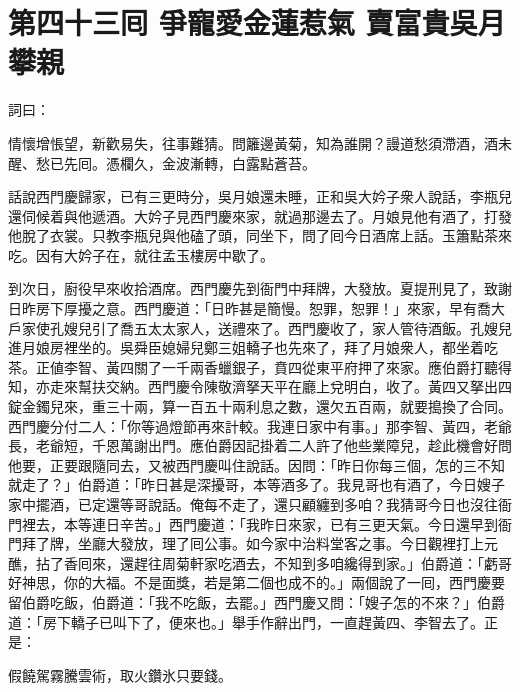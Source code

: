 
\chapter*{第四十三囘 爭寵愛金蓮惹氣 賣富貴吳月攀親}


詞曰：

\begin{myquote}
情懷增悵望，新歡易失，往事難猜。問籬邊黃菊，知為誰開？謾道愁須滯酒，酒未醒、愁已先囘。憑欄久，金波漸轉，白露點蒼苔。

\end{myquote}

話說西門慶歸家，已有三更時分，吳月娘還未睡，正和吳大妗子衆人說話，李瓶兒還伺候着與他遞酒。大妗子見西門慶來家，就過那邊去了。月娘見他有酒了，打發他脫了衣裳。只教李瓶兒與他磕了頭，同坐下，問了囘今日酒席上話。玉簫點茶來吃。因有大妗子在，就往孟玉樓房中歇了。

到次日，廚役早來收拾酒席。西門慶先到衙門中拜牌，大發放。夏提刑見了，致謝日昨房下厚擾之意。西門慶道：「日昨甚是簡慢。恕罪，恕罪！」來家，早有喬大戶家使孔嫂兒引了喬五太太家人，送禮來了。西門慶收了，家人管待酒飯。孔嫂兒進月娘房裡坐的。吳舜臣媳婦兒鄭三姐轎子也先來了，拜了月娘衆人，都坐着吃茶。正値李智、黃四關了一千兩香蠟銀子，賁四從東平府押了來家。應伯爵打聽得知，亦走來幫扶交納。西門慶令陳敬濟拏天平在廳上兌明白，收了。黃四又拏出四錠金鐲兒來，重三十兩，算一百五十兩利息之數，還欠五百兩，就要搗換了合同。西門慶分付二人：「你等過燈節再來計較。我連日家中有事。」那李智、黃四，老爺長，老爺短，千恩萬謝出門。應伯爵因記掛着二人許了他些業障兒，趁此機會好問他要，正要跟隨同去，又被西門慶叫住說話。因問：「昨日你每三個，怎的三不知就走了？」伯爵道：「昨日甚是深擾哥，本等酒多了。我見哥也有酒了，今日嫂子家中擺酒，已定還等哥說話。俺每不走了，還只顧纏到多咱？我猜哥今日也沒往衙門裡去，本等連日辛苦。」西門慶道：「我昨日來家，已有三更天氣。今日還早到衙門拜了牌，坐廳大發放，理了囘公事。如今家中治料堂客之事。今日觀裡打上元醮，拈了香囘來，還趕往周菊軒家吃酒去，不知到多咱纔得到家。」伯爵道：「虧哥好神思，你的大福。不是面獎，若是第二個也成不的。」{}兩個說了一囘，西門慶要留伯爵吃飯，伯爵道：「我不吃飯，去罷。」西門慶又問：「嫂子怎的不來？」伯爵道：「房下轎子已叫下了，便來也。」舉手作辭出門，一直趕黃四、李智去了。正是：

\begin{myquote}
假饒駕霧騰雲術，取火鑽氷只要錢。
\end{myquote}

